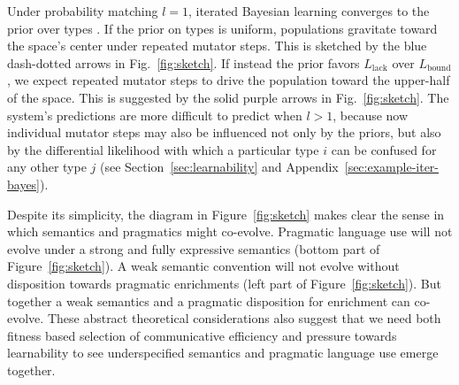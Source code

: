 \documentclass[a4paper, 11pt]{article}
\theoremstyle{Satz}
\newcommand{\mylang}[1]{\ensuremath{L_{\text{#1}}}\xspace} %
\newcommand{\Lbound}{\mylang{bound}}
\newcommand{\Llack}{\mylang{lack}}
\begin{document}
Under probability matching $l=1$, iterated Bayesian learning converges to the prior over types
\citep{griffiths+kalish:2007}. If the prior on types is uniform, populations gravitate toward
the space's center under repeated mutator steps. This is sketched by the blue dash-dotted
arrows in Fig.~\ref{fig:sketch}. If instead the prior favors $\Llack$ over $\Lbound$, we expect
repeated mutator steps to drive the population toward the upper-half of the space. This is
suggested by the solid purple arrows in Fig.~\ref{fig:sketch}. The system's predictions are
more difficult to predict when $l>1$, because now individual mutator steps may also be
influenced not only by the priors, but also by the differential likelihood with which a
particular type $i$ can be confused for any other type $j$ (see Section~\ref{sec:learnability}
and Appendix~\ref{sec:example-iter-bayes}).

Despite its simplicity, the diagram in Figure~\ref{fig:sketch} makes clear the sense in which
semantics and pragmatics might co-evolve. Pragmatic language use will not evolve under a strong
and fully expressive semantics (bottom part of Figure~\ref{fig:sketch}). A weak semantic
convention will not evolve without disposition towards pragmatic enrichments (left part of
Figure~\ref{fig:sketch}). But together a weak semantics and a pragmatic disposition for
enrichment can co-evolve. These abstract theoretical considerations also suggest that we need
both fitness based selection of communicative efficiency and pressure towards learnability to
see underspecified semantics and pragmatic language use emerge together.
\end{document}
